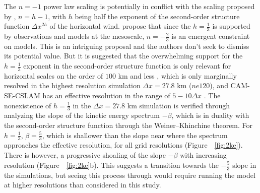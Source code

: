 \documentclass[alpha-refs]{wiley-article}
\begin{document}
The $n=-1$ power law scaling is potentially in conflict with the scaling proposed by \cite{RETAL2016CD}, $n=h-1$, with $h$ being half the exponent of the second-order structure function $\Delta x^{2h}$ of the horizontal wind. \cite{RETAL2016CD} propose that since the $h=\frac{1}{3}$ is supported by observations and models at the mesoscale, $n=-\frac{2}{3}$ is an emergent constraint on models. This is an intriguing proposal and the authors don't seek to dismiss its potential value. But it is suggested that the overwhelming support for the $h=\frac{1}{3}$ exponent in the second-order structure function is only relevant for horizontal scales on the order of $100$ km and less \citep{L1999JFM,CL2001JGR}, which is only marginally resolved in the highest resolution simulation $\Delta x=27.8$ km ($ne120$), and CAM-SE-CSLAM has an effective resolution in the range of $5-10\Delta x$ \citep{HETAL2019JAMES}. The nonexistence of $h=\frac{1}{3}$ in the $\Delta x=27.8$ km simulation is verified through analyzing the slope of the kinetic energy spectrum $-\beta$, which is in duality with the second-order structure function through the Weiner–Khinchine theorem. For $h=\frac{1}{3}$, $\beta=\frac{5}{3}$, which is shallower than the slope near where the spectrum approaches the effective resolution, for all grid resolutions (Figure~~\ref{fig:2ke}). There is however, a progressive shoaling of the slope $-\beta$ with increasing resolution (Figure~~\ref{fig:2ke}b). This suggests a transition towards the $-\frac{5}{3}$ slope in the simulations, but seeing this process through would require running the model at higher resolutions than considered in this study.
\end{document}
